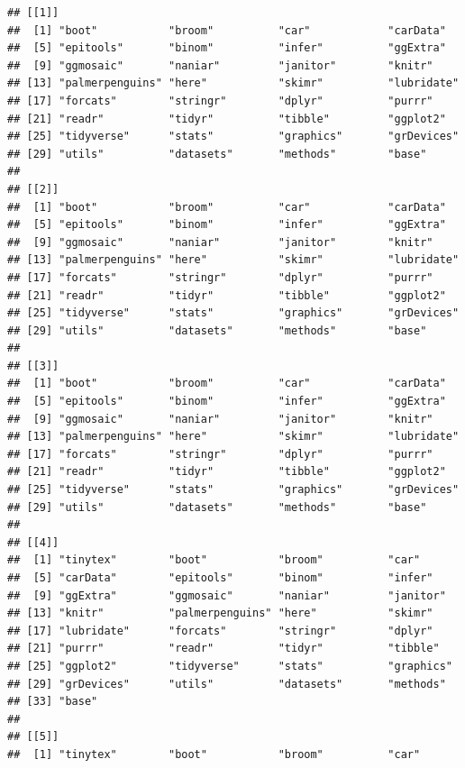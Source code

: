 \documentclass[
]{book}
\begin{document}
\begin{verbatim}
## [[1]]
##  [1] "boot"           "broom"          "car"            "carData"       
##  [5] "epitools"       "binom"          "infer"          "ggExtra"       
##  [9] "ggmosaic"       "naniar"         "janitor"        "knitr"         
## [13] "palmerpenguins" "here"           "skimr"          "lubridate"     
## [17] "forcats"        "stringr"        "dplyr"          "purrr"         
## [21] "readr"          "tidyr"          "tibble"         "ggplot2"       
## [25] "tidyverse"      "stats"          "graphics"       "grDevices"     
## [29] "utils"          "datasets"       "methods"        "base"          
## 
## [[2]]
##  [1] "boot"           "broom"          "car"            "carData"       
##  [5] "epitools"       "binom"          "infer"          "ggExtra"       
##  [9] "ggmosaic"       "naniar"         "janitor"        "knitr"         
## [13] "palmerpenguins" "here"           "skimr"          "lubridate"     
## [17] "forcats"        "stringr"        "dplyr"          "purrr"         
## [21] "readr"          "tidyr"          "tibble"         "ggplot2"       
## [25] "tidyverse"      "stats"          "graphics"       "grDevices"     
## [29] "utils"          "datasets"       "methods"        "base"          
## 
## [[3]]
##  [1] "boot"           "broom"          "car"            "carData"       
##  [5] "epitools"       "binom"          "infer"          "ggExtra"       
##  [9] "ggmosaic"       "naniar"         "janitor"        "knitr"         
## [13] "palmerpenguins" "here"           "skimr"          "lubridate"     
## [17] "forcats"        "stringr"        "dplyr"          "purrr"         
## [21] "readr"          "tidyr"          "tibble"         "ggplot2"       
## [25] "tidyverse"      "stats"          "graphics"       "grDevices"     
## [29] "utils"          "datasets"       "methods"        "base"          
## 
## [[4]]
##  [1] "tinytex"        "boot"           "broom"          "car"           
##  [5] "carData"        "epitools"       "binom"          "infer"         
##  [9] "ggExtra"        "ggmosaic"       "naniar"         "janitor"       
## [13] "knitr"          "palmerpenguins" "here"           "skimr"         
## [17] "lubridate"      "forcats"        "stringr"        "dplyr"         
## [21] "purrr"          "readr"          "tidyr"          "tibble"        
## [25] "ggplot2"        "tidyverse"      "stats"          "graphics"      
## [29] "grDevices"      "utils"          "datasets"       "methods"       
## [33] "base"          
## 
## [[5]]
##  [1] "tinytex"        "boot"           "broom"          "car"           

\end{verbatim}
\end{document}
